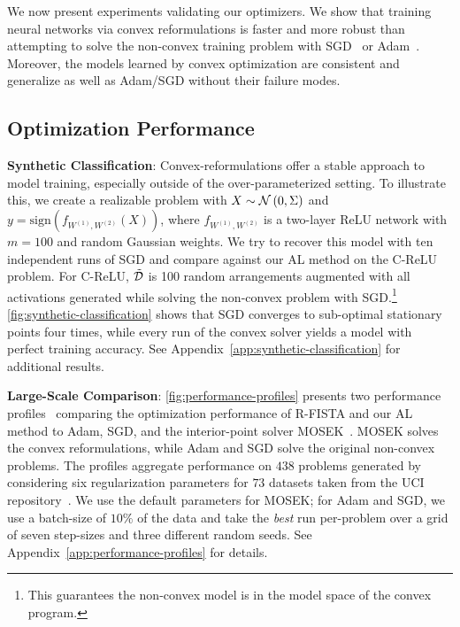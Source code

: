 
We now present experiments validating our optimizers.
We show that training neural networks via convex reformulations is faster and more robust than attempting to solve the non-convex training problem with SGD~\citep{robbins1951sgd} or Adam~\citep{kingma2015adam}.
Moreover, the models learned by convex optimization are consistent and generalize as well as Adam/SGD without their failure modes.

\subsection{Optimization Performance}\label{sec:optimization-performance}



\textbf{Synthetic Classification}:
Convex-reformulations offer a stable approach to model training, especially outside of the over-parameterized setting.
To illustrate this, we create a realizable problem with \( X \sim \mathcal{N}\left(0, \Sigma\right) \) and \( y = \text{sign}(f_{W^{(1)}, W^{(2)}}(X)) \), where \( f_{W^{(1)}, W^{(2)}} \) is a two-layer ReLU network with \( m = 100 \) and random Gaussian weights.
We try to recover this model with ten independent runs of SGD and compare against our AL method on the C-ReLU problem.
For C-ReLU, \( \tilde {\mathcal{D}} \) is 100 random arrangements augmented with all activations generated while solving the non-convex problem with SGD.\footnote{This guarantees the non-convex model is in the model space of the convex program.}
\cref{fig:synthetic-classification} shows that SGD converges to sub-optimal stationary points four times, while every run of the convex solver yields a model with perfect training accuracy.
See Appendix~\ref{app:synthetic-classification} for additional results.

\textbf{Large-Scale Comparison}:
\cref{fig:performance-profiles} presents two performance profiles~\citep{dolan2002benchmarking} comparing the optimization performance of R-FISTA and our AL method to Adam, SGD, and the interior-point solver MOSEK~\citep{mosek}.
MOSEK solves the convex reformulations, while Adam and SGD solve the original non-convex problems.
The profiles aggregate performance on \( 438 \) problems generated by considering six regularization parameters for \( 73 \) datasets taken from the UCI repository~\citep{dua2019uci}.
We use the default parameters for MOSEK;
for Adam and SGD, we use a batch-size of \( 10\% \) of the data and take the \emph{best} run per-problem over a grid of seven step-sizes and three different random seeds.
See Appendix~\ref{app:performance-profiles} for details.

